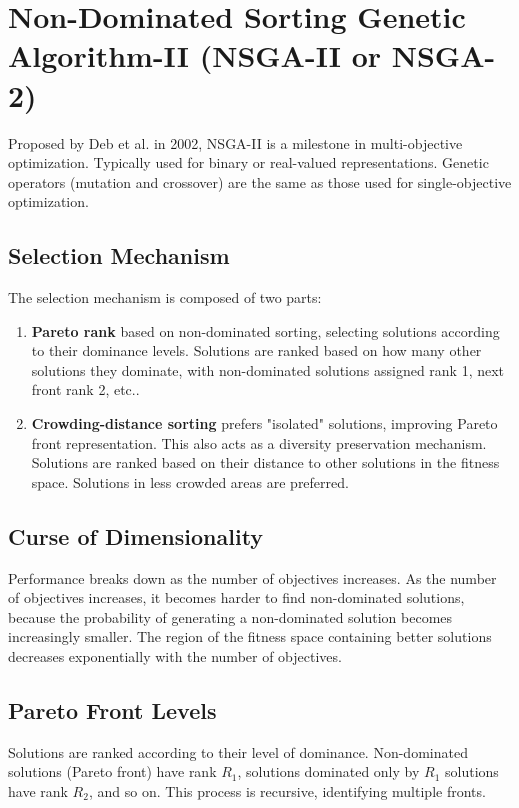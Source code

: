 \section{Non-Dominated Sorting Genetic Algorithm-II (NSGA-II or NSGA-2)}

Proposed by Deb et al. in 2002, NSGA-II is a milestone in multi-objective optimization.
Typically used for binary or real-valued representations.
Genetic operators (mutation and crossover) are the same as those used for single-objective optimization.

\subsection*{Selection Mechanism}

The selection mechanism is composed of two parts:
\begin{enumerate}
    \item \textbf{Pareto rank} based on non-dominated sorting, selecting solutions according to their dominance levels.  Solutions are ranked based on how many other solutions they dominate, with non-dominated solutions assigned rank 1, next front rank 2, etc..
     \item \textbf{Crowding-distance sorting} prefers "isolated" solutions, improving Pareto front representation.  This also acts as a diversity preservation mechanism.  Solutions are ranked based on their distance to other solutions in the fitness space. Solutions in less crowded areas are preferred.
\end{enumerate}

\subsection*{Curse of Dimensionality}

Performance breaks down as the number of objectives increases.
As the number of objectives increases, it becomes harder to find non-dominated solutions, because the probability of generating a non-dominated solution becomes increasingly smaller.  The region of the fitness space containing better solutions decreases exponentially with the number of objectives.

\subsection*{Pareto Front Levels}

Solutions are ranked according to their level of dominance.
Non-dominated solutions (Pareto front) have rank $R_1$, solutions dominated only by $R_1$ solutions have rank $R_2$, and so on.  This process is recursive, identifying multiple fronts.


